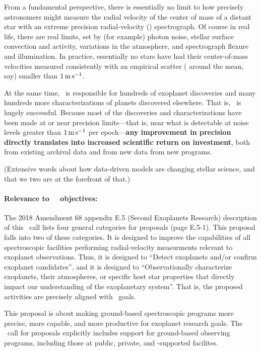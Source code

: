 \documentclass[12pt, letterpaper]{article}
\begin{document}
\sloppy\sloppypar\raggedbottom\frenchspacing


\noindent
From a fundamental perspective, there is essentially no limit to how
precisely astronomers might measure the radial velocity of the center of mass
of a distant star with an extreme precision radial-velocity (\EPRV) spectrograph.
Of course in real life, there are real limits, set
by (for example) photon noise, stellar surface convection and activity,
variations in the atmosphere, and spectrograph flexure and illumination.
In practice, essentially no stars have had their center-of-mass
velocities measured consistently with an empirical scatter
( around the mean, say) smaller than $1\,{\mathrm{m\,s^{-1}}}$.

At the same time, \EPRV\ is responsible for hundreds of  exoplanet discoveries and many hundreds more  characterizations of planets discovered elsewhere.
That is, \EPRV\ is hugely successful.
Because most of the discoveries and characterizations have been made
at or near precision limits---that is, near what is detectable at noise levels
greater than $1\,{\mathrm{m\,s^{-1}}}$ per epoch---\textbf{any improvement in precision directly
translates into increased scientific return on investment},
both from existing archival data and from new data from new programs.

(Extensive words about how data-driven models are changing stellar science, and
that we two are at the forefront of that.)

\paragraph{Relevance to \NASA\ \XRP\ objectives:} The 2018 
Amendment 68 appendix E.5 (Second Exoplanets Research) description of this
\XRP\ call lists four general categories for proposals (page
E.5-1).
This proposal falls into two of these categories.
It is designed to improve the capabilities of all spectroscopic
facilities performing radial-velocity measurments relevant to
exoplanet observations.
Thus, it is designed to ``Detect exoplanets and/or confirm exoplanet
candidates'', and it is designed to ``Observationally characterize
exoplanets, their atmospheres, or specific host star properties that
directly impact our understanding of the exoplanetary system''.
That is, the proposed activities are precisely aligned with
\XRP\ goals.

This proposal is about making ground-based spectroscopic programs more
precise, more capable, and more productive for exoplanet research
goals.
The \XRP\ call for proposals explicitly includes support for
ground-based observing programs, including those at public, private,
and \NASA-supported facilites.
\end{document}
